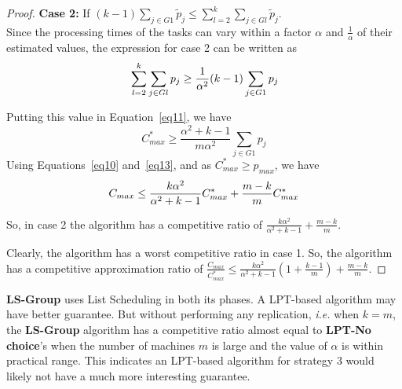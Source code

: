 \begin{proof}
   \textbf{Case 2:} If $(k-1)\sum_{j \in G1 }^{}{\tilde p_{j}} \leq \sum_{l=2}^{k}\sum_{j \in Gl }^{}{\tilde p_{j}}$. \\
   
   Since the processing times of the tasks can vary within a factor
   $\alpha$ and $\frac{1}{\alpha}$ of their estimated values, the
   expression for case 2 can be written as
   \begin{equation}{\nonumber}
     \sum_{l=2}^{k}\sum_{j \in Gl }^{}{ p_{j}} \geq \frac{1}{\alpha^2} (k-1)\sum_{j \in G1 }^{}{ p_{j}}
   \end{equation}
   
   Putting this value in Equation~\ref{eq11}, we have
   \begin{equation}\label{eq13}
     C_{max}^{*} \geq \frac{\alpha^2+k-1}{m\alpha^2}\sum_{j \in G1 }^{}{ p_{j}}
   \end{equation}
   Using Equations~\ref{eq10} and~\ref{eq13}, and as $C_{max}^{*} \geq p_{max}$, we have
   \begin{equation}{\nonumber}
     C_{max} \leq \frac{k\alpha^2}{\alpha^2+k-1}C_{max}^{*}+\frac{m-k}{m}C_{max}^{*}
   \end{equation}
   
   So, in case 2 the algorithm has a competitive ratio of
   $\frac{k\alpha^2}{\alpha^2+k-1}+\frac{m-k}{m}$.
 
   Clearly, the algorithm has a worst competitive ratio in case 1.  So,
   the algorithm has a competitive approximation ratio of
   $\frac{C_{max}}{C_{max}^{*}} \leq \frac{k\alpha^{2}}{\alpha^{2}+k-1}
   \left( 1+ {\frac{k-1}{m}} \right) + {\frac{m-k}{m}}$.
 \end{proof}
 
 
 \textbf{LS-Group} uses List Scheduling in both its phases. A LPT-based
 algorithm may have better guarantee. But without performing any
 replication, {\em i.e.} when $k=m$, the \textbf{LS-Group} algorithm
 has a competitive ratio almost equal to \textbf{LPT-No choice}'s when
 the number of machines $m$ is large and the value of $\alpha$ is
 within practical range. This indicates an LPT-based algorithm for
 strategy 3 would likely not have a much more interesting guarantee.